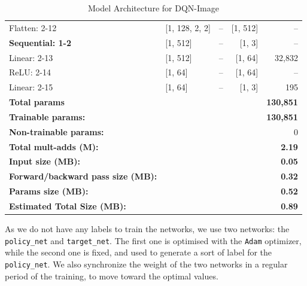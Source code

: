 \begin{table}
\begin{adjustbox}{max width=\linewidth}
\begin{tabular}{@{}llcrr@{}}
			\quad \quad Flatten: 2-12                & [1, 128, 2, 2]   & --            & [1, 512]         & --     \\
			\quad \textbf{Sequential: 1-2}                   & [1, 512]         & --            & [1, 3]           & --     \\
			\quad \quad Linear: 2-13                 & [1, 512]         & --            & [1, 64]          & 32,832 \\
			\quad \quad ReLU: 2-14                   & [1, 64]          & --            & [1, 64]          & --     \\
			\quad \quad Linear: 2-15                 & [1, 64]          & --            & [1, 3]           & 195    \\
			\midrule
			\textbf{Total params}                              &                   &              &                   & \textbf{130,851}\\
			\textbf{Trainable params:}                         &                   &              &                   & \textbf{130,851}\\
			\textbf{Non-trainable params:}                     &                   &              &                   & 0      \\
			\textbf{Total mult-adds (M):}                      &                   &              &                   & \textbf{2.19}   \\
			\midrule
			\textbf{Input size (MB):}                          &                   &              &                   & \textbf{0.05}    \\
			\textbf{Forward/backward pass size (MB):}          &                   &              &                   & \textbf{0.32}    \\
			\textbf{Params size (MB):}                         &                   &              &                   & \textbf{0.52}     \\
			\textbf{Estimated Total Size (MB):}                &                   &              &                   & \textbf{0.89}     \\
			\bottomrule
		\end{tabular}
	\end{adjustbox}
	\caption{Model Architecture for DQN-Image}
	\label{tab:cnn-dqn}
\end{table}




As we do not have any labels to train the networks, we use two networks: the \texttt{policy\_net} and \texttt{target\_net}. The first one is optimised with the \texttt{Adam} optimizer, while the second one is fixed, and used to generate a sort of label for the \texttt{policy\_net}. We also synchronize the weight of the two networks in a regular period of the training, to move toward the optimal values.


